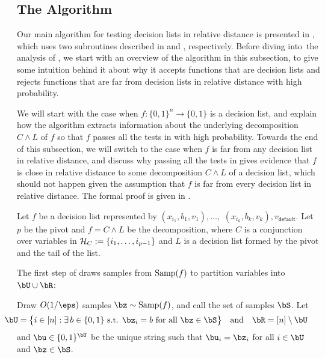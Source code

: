 \documentclass[11pt]{article}
\theoremstyle{definition}
\begin{document}
\subsection{The Algorithm}
\label{sec:DL-algorithm}

Our main algorithm for testing decision lists in relative distance is presented in ,
  which uses two subroutines described in  and , respectively.
Before diving into~the analysis of , we start with an overview of the algorithm in this subsection, to give some intuition behind it about why it accepts functions that are decision lists and rejects functions that are far from decision lists in relative  distance with high probability.


We will start with the case when $f:\{0,1\}^n\rightarrow \{0,1\}$ is a decision list, and explain how the algorithm 
  extracts information about the underlying decomposition
  $C\land L$ of $f$ so that $f$ passes all the tests in
   with high probability.
Towards the end of this subsection, we will switch to 
  the case when $f$ is far from any decision list in relative distance, and discuss why passing all the tests 
  in  gives evidence that 
  $f$ is close in relative distance to some decomposition
  $C\land L$ of a decision list, which should not happen given the assumption that $f$ is far from every decision list in relative distance.
The formal proof is given in .

  \medskip
Let $f$ be a decision list represented by 
  $(x_{i_1},b_{1},v_1),\ldots,$ $(x_{i_k},b_k,v_k),v_{\textsf{default}}$.
Let $p$ be the pivot and $f=C\land L$ be the decomposition,
  where $C$ is a conjunction over variables in ${\cal H}_C:=\{i_1,\ldots,i_{p-1}\}$ and 
  $L$ is a decision list formed by the pivot and the tail of the list.






The first step of  draws samples from $\mathrm{Samp}(f)$ to partition variables into $\bU\cup \bR$:\medskip





\begin{algorithm}[H]\begin{algorithmic}[1] \vspace{0.2cm}
    \setcounter{ALG@line}{1}
            \State Draw $O(1/\eps)$ samples $\bz \sim \SAMP(f)$, and call the set of samples $\bS$. Let 
    $$\hspace{-1cm}\bU=\big\{i\in [n]  : \exists \, b\in \{0,1\} \text{ s.t. } \bz_i = b \ \text{for all $\bz \in \bS$} \big\} \quad\text{and}\quad
    \bR=[n] \setminus \bU$$ 
 and $\bu \in \{0,1\}^{\bU}$ be the unique string such that $\bu_i=\bz_i$ for all $i\in \bU$ and $\bz \in \bS$.\vspace{0.15cm}  
    \end{algorithmic}
\end{algorithm}\medskip
\end{document}
